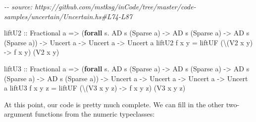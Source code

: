 \documentclass[]{article}
\newenvironment{Shaded}{}{}
\newcommand{\CommentTok}[1]{\textcolor[rgb]{0.38,0.63,0.69}{\textit{#1}}}
\newcommand{\DataTypeTok}[1]{\textcolor[rgb]{0.56,0.13,0.00}{#1}}
\newcommand{\KeywordTok}[1]{\textcolor[rgb]{0.00,0.44,0.13}{\textbf{#1}}}
\newcommand{\NormalTok}[1]{#1}
\newcommand{\OperatorTok}[1]{\textcolor[rgb]{0.40,0.40,0.40}{#1}}
\newcommand{\OtherTok}[1]{\textcolor[rgb]{0.00,0.44,0.13}{#1}}
\begin{document}
\begin{Shaded}
\begin{Highlighting}[]
\CommentTok{{-}{-} source: https://github.com/mstksg/inCode/tree/master/code{-}samples/uncertain/Uncertain.hs\#L74{-}L87}

\OtherTok{liftU2 ::} \DataTypeTok{Fractional}\NormalTok{ a}
       \OtherTok{=\textgreater{}}\NormalTok{ (}\KeywordTok{forall}\NormalTok{ s}\OperatorTok{.} \DataTypeTok{AD}\NormalTok{ s (}\DataTypeTok{Sparse}\NormalTok{ a) }\OtherTok{{-}\textgreater{}} \DataTypeTok{AD}\NormalTok{ s (}\DataTypeTok{Sparse}\NormalTok{ a) }\OtherTok{{-}\textgreater{}} \DataTypeTok{AD}\NormalTok{ s (}\DataTypeTok{Sparse}\NormalTok{ a))}
       \OtherTok{{-}\textgreater{}} \DataTypeTok{Uncert}\NormalTok{ a}
       \OtherTok{{-}\textgreater{}} \DataTypeTok{Uncert}\NormalTok{ a}
       \OtherTok{{-}\textgreater{}} \DataTypeTok{Uncert}\NormalTok{ a}
\NormalTok{liftU2 f x y }\OtherTok{=}\NormalTok{ liftUF (\textbackslash{}(}\DataTypeTok{V2}\NormalTok{ x\textquotesingle{} y\textquotesingle{}) }\OtherTok{{-}\textgreater{}}\NormalTok{ f x\textquotesingle{} y\textquotesingle{}) (}\DataTypeTok{V2}\NormalTok{ x y)}

\OtherTok{liftU3 ::} \DataTypeTok{Fractional}\NormalTok{ a}
       \OtherTok{=\textgreater{}}\NormalTok{ (}\KeywordTok{forall}\NormalTok{ s}\OperatorTok{.} \DataTypeTok{AD}\NormalTok{ s (}\DataTypeTok{Sparse}\NormalTok{ a) }\OtherTok{{-}\textgreater{}} \DataTypeTok{AD}\NormalTok{ s (}\DataTypeTok{Sparse}\NormalTok{ a) }\OtherTok{{-}\textgreater{}} \DataTypeTok{AD}\NormalTok{ s (}\DataTypeTok{Sparse}\NormalTok{ a) }\OtherTok{{-}\textgreater{}} \DataTypeTok{AD}\NormalTok{ s (}\DataTypeTok{Sparse}\NormalTok{ a))}
       \OtherTok{{-}\textgreater{}} \DataTypeTok{Uncert}\NormalTok{ a}
       \OtherTok{{-}\textgreater{}} \DataTypeTok{Uncert}\NormalTok{ a}
       \OtherTok{{-}\textgreater{}} \DataTypeTok{Uncert}\NormalTok{ a}
       \OtherTok{{-}\textgreater{}} \DataTypeTok{Uncert}\NormalTok{ a}
\NormalTok{liftU3 f x y z }\OtherTok{=}\NormalTok{ liftUF (\textbackslash{}(}\DataTypeTok{V3}\NormalTok{ x\textquotesingle{} y\textquotesingle{} z\textquotesingle{}) }\OtherTok{{-}\textgreater{}}\NormalTok{ f x\textquotesingle{} y\textquotesingle{} z\textquotesingle{}) (}\DataTypeTok{V3}\NormalTok{ x y z)}
\end{Highlighting}
\end{Shaded}

At this point, our code is pretty much complete. We can fill in the other
two-argument functions from the numeric typeclasses:
\end{document}
